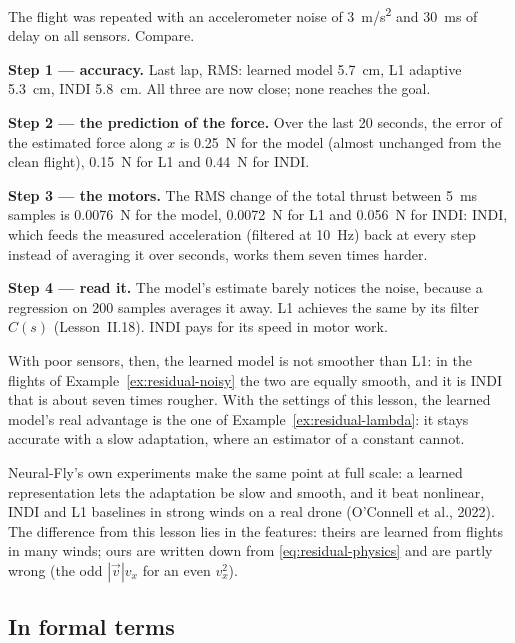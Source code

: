 \begin{example}
\label{ex:residual-noisy}
The flight was repeated with an accelerometer noise of \SI{3}{m/s^2} and \SI{30}{ms} of delay on all sensors. Compare.

\textbf{Step 1 — accuracy.} Last lap, RMS: learned model \SI{5.7}{cm}, L1 adaptive \SI{5.3}{cm}, INDI \SI{5.8}{cm}. All three are now close; none reaches the goal.

\textbf{Step 2 — the prediction of the force.} Over the last 20 seconds, the error of the estimated force along $x$ is \SI{0.25}{N} for the model (almost unchanged from the clean flight), \SI{0.15}{N} for L1 and \SI{0.44}{N} for INDI.

\textbf{Step 3 — the motors.} The RMS change of the total thrust between \SI{5}{ms} samples is \SI{0.0076}{N} for the model, \SI{0.0072}{N} for L1 and \SI{0.056}{N} for INDI: INDI, which feeds the measured acceleration (filtered at \SI{10}{Hz}) back at every step instead of averaging it over seconds, works them seven times harder.

\textbf{Step 4 — read it.} The model's estimate barely notices the noise, because a regression on 200 samples averages it away. L1 achieves the same by its filter $C(s)$ (Lesson~II.18). INDI pays for its speed in motor work.
\end{example}

\begin{watchout}
With poor sensors, then, the learned model is not smoother than L1: in the flights of Example~\ref{ex:residual-noisy} the two are equally smooth, and it is INDI that is about seven times rougher. With the settings of this lesson, the learned model's real advantage is the one of Example~\ref{ex:residual-lambda}: it stays accurate with a slow adaptation, where an estimator of a constant cannot.
\end{watchout}

Neural-Fly's own experiments make the same point at full scale: a learned representation lets the adaptation be slow and smooth, and it beat nonlinear, INDI and L1 baselines in strong winds on a real drone (O'Connell et al., 2022). The difference from this lesson lies in the features: theirs are learned from flights in many winds; ours are written down from \cref{eq:residual-physics} and are partly wrong (the odd $|\vec v|v_x$ for an even $v_x^2$).

\subsection{In formal terms}

